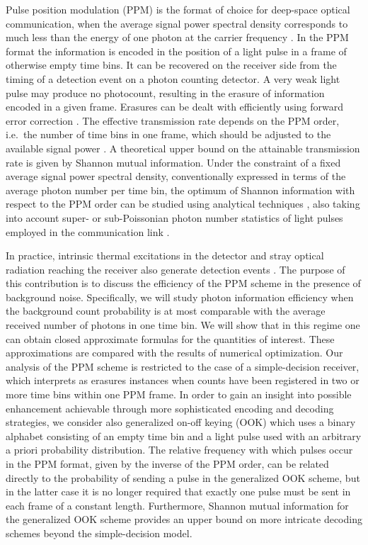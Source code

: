 \documentclass[conference]{IEEEtran}
\begin{document}
Pulse position modulation (PPM) is the format of choice for deep-space optical communication, when the average signal power spectral density corresponds to much less than  the energy of one photon at the carrier frequency \cite{Hemmati2011}. In the PPM format the information is encoded in the position of a light pulse in a frame of otherwise empty time bins. It can be recovered on the receiver side from the timing of a detection event on a photon counting detector. A very weak light pulse may produce no photocount, resulting in the erasure of information encoded in a given frame. Erasures can be dealt with efficiently using forward error correction \cite{Dolinar2006}. The effective transmission rate depends on the PPM order, i.e.\ the number of time bins in one frame,  which should be adjusted to the available signal power \cite{Waseda2011}. A theoretical upper bound on the attainable transmission rate is given by Shannon mutual information. Under the constraint of a fixed average signal power spectral density, conventionally expressed in terms of the average photon number per time bin, the optimum of Shannon information with respect to the PPM order can be studied using analytical techniques \cite{Wang2014}, also taking into account super- or sub-Poissonian photon number statistics of light pulses employed in the communication link \cite{Jarzyna2015}.

In practice, intrinsic thermal excitations in the detector and stray optical radiation reaching the receiver also generate detection events \cite{Moision2014}. The purpose of this contribution is to discuss the efficiency of the PPM scheme in the presence of background noise. Specifically, we will study photon information efficiency when the background count probability is at most comparable with the average received number of photons in one time bin. We will show that in this regime one can obtain closed approximate formulas for the quantities of interest. These approximations are compared with the results of numerical optimization. Our analysis of the PPM scheme is restricted to the case of a simple-decision receiver, which interprets  as erasures instances when counts have been registered in two or more time bins within one PPM frame. In order to gain an insight into possible enhancement achievable through more sophisticated encoding and decoding strategies, we consider also generalized on-off keying (OOK) which uses a binary alphabet consisting of an empty time bin and a light pulse used with an arbitrary a priori probability distribution. The relative frequency with which pulses occur in the PPM format, given  by the inverse of the PPM order, can be related directly to the probability of sending a pulse in the generalized OOK scheme, but in the latter case it is no longer required that exactly one pulse must be sent in each frame of a constant length. Furthermore, Shannon mutual information for the generalized OOK scheme provides an upper bound on more intricate decoding schemes beyond the simple-decision model.
\end{document}
